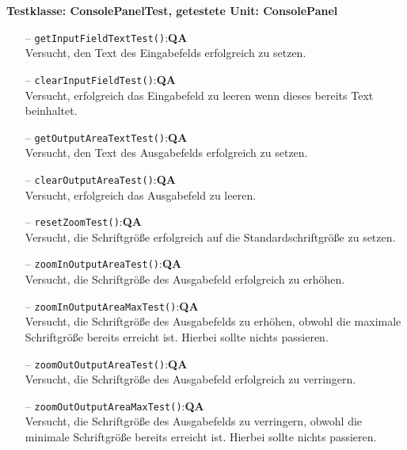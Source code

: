 \documentclass[parskip=full,11pt,twoside]{scrartcl}
\def\qa{\hfill\textbf{QA}}
\begin{document}
\textbf{Testklasse: ConsolePanelTest, getestete Unit: ConsolePanel}
\begin{itemize}
	\item[--] \texttt{getInputFieldTextTest()}:\qa\\
	Versucht, den Text des Eingabefelds erfolgreich zu setzen.
	\item[--] \texttt{clearInputFieldTest()}:\qa\\
	Versucht, erfolgreich das Eingabefeld zu leeren wenn dieses bereits Text beinhaltet.
	\item[--] \texttt{getOutputAreaTextTest()}:\qa\\
	Versucht, den Text des Ausgabefelds erfolgreich zu setzen.
	\item[--] \texttt{clearOutputAreaTest()}:\qa\\
	Versucht, erfolgreich das Ausgabefeld zu leeren.
	\item[--] \texttt{resetZoomTest()}:\qa\\
	Versucht, die Schriftgröße erfolgreich auf die Standardschriftgröße zu setzen.
	\item[--] \texttt{zoomInOutputAreaTest()}:\qa\\
	Versucht, die Schriftgröße des Ausgabefeld erfolgreich zu erhöhen.
	\item[--] \texttt{zoomInOutputAreaMaxTest()}:\qa\\
        Versucht, die Schriftgröße des Ausgabefelds zu erhöhen, obwohl die maximale\\Schriftgröße bereits erreicht ist. Hierbei sollte nichts passieren.
	\item[--] \texttt{zoomOutOutputAreaTest()}:\qa\\
	Versucht, die Schriftgröße des Ausgabefeld erfolgreich zu verringern.
	\item[--] \texttt{zoomOutOutputAreaMaxTest()}:\qa\\
	Versucht, die Schriftgröße des Ausgabefelds zu verringern, obwohl die minimale Schriftgröße bereits erreicht ist. Hierbei sollte nichts passieren.
\end{itemize}
\end{document}
